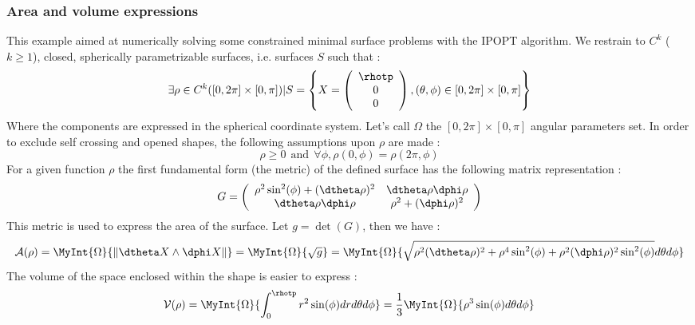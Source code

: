 \documentclass[a4paper,twoside,12pt]{book}
\begin{document}
\subsubsection{Area and volume expressions}
This example aimed at numerically solving some constrained minimal surface problems with the IPOPT algorithm. We restrain to $C^{k}$ ($k\geq 1$), closed, spherically parametrizable surfaces, i.e. surfaces $S$ such that :
$$ \exists \rho \in C^{k}([0,2\pi ]\times[0,\pi] ) \vert 
S = \left\lbrace 
X = \left(
\begin{array} {c}
 \rhotp \\
 0 \\
 0
\end{array}
\right)
, (\theta,\phi) \in [0,2\pi ]\times[0,\pi]
  \right\rbrace$$
Where the components are expressed in the spherical coordinate system. Let's call $\Omega$ the  $[0,2\pi ]\times[0,\pi]$ angular parameters set. In order to exclude self crossing and opened shapes, the following assumptions upon $\rho$ are made :
$$ \rho \geq 0\ \ \mathrm{and}\ \ \forall \phi, \rho(0,\phi) = \rho(2\pi,\phi)$$
For a given function $\rho$ the first fundamental form (the metric) of the defined surface has the following matrix representation :
\begin{equation}\label{msfff}
G = 
\left(
\begin{array}{c c}
	\rho^{2}\sin^{2}(\phi) + (\dtheta\rho)^{2} &\dtheta\rho\dphi\rho \\
	\dtheta\rho\dphi\rho & \rho^{2} + (\dphi\rho)^{2} \\
\end{array}
\right)
\end{equation}
This metric is used to express the area of the surface. Let $g=\det(G)$, then we have :
\begin{equation}\label{msarea}
	\mathcal{A}(\rho) 
	= \MyInt{\Omega}{\left\| \dtheta X \wedge \dphi X \right\|}
	=\MyInt{\Omega}{\sqrt{g}}
	=\MyInt{\Omega}{\sqrt{ \rho^{2}(\dtheta\rho)^{2}  + \rho^{4}\sin^{2}(\phi) + \rho^{2}(\dphi\rho)^{2}\sin^{2}(\phi)}d\theta d\phi}
\end{equation}
The volume of the space enclosed within the shape is easier to express :
\begin{equation}\label{msvolume}
	\mathcal{V}(\rho)
	= \MyInt{\Omega}{\int_{0}^{\rhotp} r^{2}\sin(\phi) dr d\theta d\phi}
	= \frac{1}{3}\MyInt{\Omega}{\rho^{3} \sin(\phi) d\theta d\phi}
\end{equation}
\end{document}
